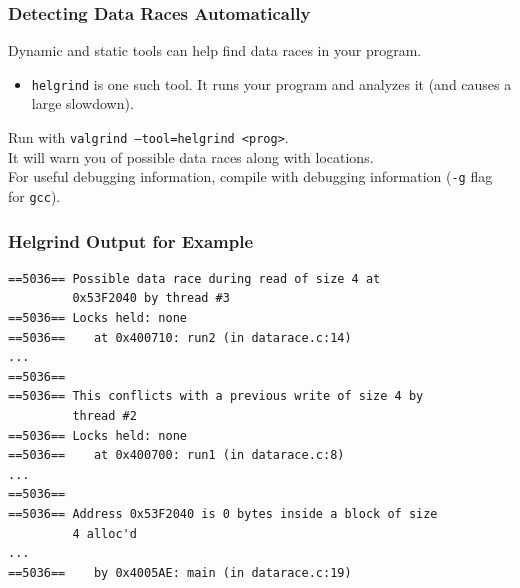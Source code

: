 \documentclass[aspectratio=43]{beamer}
\newenvironment{changemargin}[1]{%
  \begin{list}{}{%
    \setlength{\topsep}{0pt}%
    \setlength{\leftmargin}{#1}%
    \setlength{\rightmargin}{1em}
    \setlength{\listparindent}{\parindent}%
    \setlength{\itemindent}{\parindent}%
    \setlength{\parsep}{\parskip}%
  }%
  \item[]}{\end{list}}
\begin{document}
\begin{frame}
  \frametitle{Detecting Data Races Automatically}  

  \begin{changemargin}{2.5cm}
    Dynamic and static tools can help find data races in your program.
  \begin{itemize}
    \item {\tt helgrind} is one such tool. It runs your program 
      and analyzes it (and causes a large slowdown).
  \end{itemize}
    Run with {\tt valgrind --tool=helgrind <prog>}.\\[1em]
    It will warn you of possible data races along with locations.\\[1em]
    For useful debugging information, compile with debugging information
      ({\tt -g} flag for {\tt gcc}).
  \end{changemargin}
\end{frame}

\begin{frame}[fragile]
  \frametitle{Helgrind Output for Example}

  \begin{changemargin}{.8cm}
  \begin{lstlisting}
==5036== Possible data race during read of size 4 at
         0x53F2040 by thread #3
==5036== Locks held: none
==5036==    at 0x400710: run2 (in datarace.c:14)
...
==5036== 
==5036== This conflicts with a previous write of size 4 by
         thread #2
==5036== Locks held: none
==5036==    at 0x400700: run1 (in datarace.c:8)
...
==5036== 
==5036== Address 0x53F2040 is 0 bytes inside a block of size
         4 alloc'd
...
==5036==    by 0x4005AE: main (in datarace.c:19)
  \end{lstlisting}
  \end{changemargin}
\end{frame}
\end{document}
